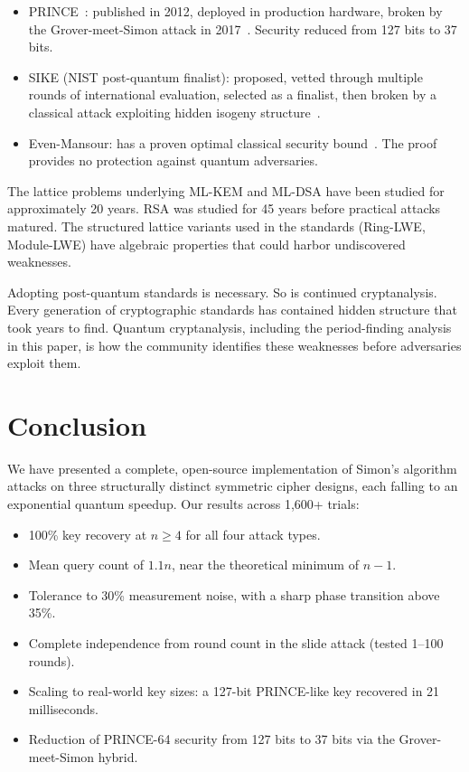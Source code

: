 \documentclass[11pt]{article}
\begin{document}
\begin{itemize}
    \item PRINCE~\cite{borghoff2012}: published in 2012, deployed in production hardware, broken by the Grover-meet-Simon attack in 2017~\cite{leander2017}. Security reduced from 127 bits to 37 bits.
    \item SIKE (NIST post-quantum finalist): proposed, vetted through multiple rounds of international evaluation, selected as a finalist, then broken by a classical attack exploiting hidden isogeny structure~\cite{castryck2023}.
    \item Even-Mansour: has a proven optimal classical security bound~\cite{dunkelman2012}. The proof provides no protection against quantum adversaries.
\end{itemize}

The lattice problems underlying ML-KEM and ML-DSA have been studied for approximately 20 years. RSA was studied for 45 years before practical attacks matured. The structured lattice variants used in the standards (Ring-LWE, Module-LWE) have algebraic properties that could harbor undiscovered weaknesses.

Adopting post-quantum standards is necessary. So is continued cryptanalysis. Every generation of cryptographic standards has contained hidden structure that took years to find. Quantum cryptanalysis, including the period-finding analysis in this paper, is how the community identifies these weaknesses before adversaries exploit them.

\section{Conclusion}

We have presented a complete, open-source implementation of Simon's algorithm attacks on three structurally distinct symmetric cipher designs, each falling to an exponential quantum speedup. Our results across 1,600+ trials:

\begin{itemize}
    \item 100\% key recovery at $n \geq 4$ for all four attack types.
    \item Mean query count of $1.1n$, near the theoretical minimum of $n-1$.
    \item Tolerance to 30\% measurement noise, with a sharp phase transition above 35\%.
    \item Complete independence from round count in the slide attack (tested 1--100 rounds).
    \item Scaling to real-world key sizes: a 127-bit PRINCE-like key recovered in 21 milliseconds.
    \item Reduction of PRINCE-64 security from 127 bits to 37 bits via the Grover-meet-Simon hybrid.
\end{itemize}
\end{document}
